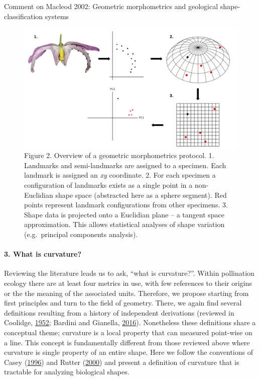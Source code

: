 \documentclass[]{article}
\let\oldparagraph\paragraph
\renewcommand{\paragraph}[1]{\oldparagraph{#1}\mbox{}}
\begin{document}
Comment on Macleod 2002: Geometric morphometrics and geological
shape-classification systems

\begin{figure}
\centering
\includegraphics{Figures/Figure_2.jpg}
\caption{Figure 2. Overview of a geometric morphometrics protocol. 1.
Landmarks and semi-landmarks are assigned to a specimen. Each landmark
is assigned an \emph{xy} coordinate. 2. For each specimen a
configuration of landmarks exists as a single point in a non-Euclidian
shape space (abstracted here as a sphere segment). Red points represent
landmark configurations from other specimens. 3. Shape data is projected
onto a Euclidian plane -- a tangent space approximation. This allows
statistical analyses of shape variation (e.g.~principal components
analysis).}
\end{figure}

\hypertarget{what-is-curvature}{%
\paragraph{3. What is curvature?}\label{what-is-curvature}}

Reviewing the literature leads us to ask, ``what is curvature?''. Within
pollination ecology there are at least four metrics in use, with few
references to their origins or the the meaning of the associated units.
Therefore, we propose starting from first principles and turn to the
field of geometry. There, we again find several definitions resulting
from a history of independent derivations (reviewed in Coolidge,
\protect\hyperlink{ref-coolidge_1952}{1952}; Bardini and Gianella,
\protect\hyperlink{ref-bardini_2016}{2016}). Nonetheless these
definitions share a conceptual theme; curvature is a local property that
can measured point-wise on a line. This concept is fundamentally
different from those reviewed above where curvature is single property
of an entire shape. Here we follow the conventions of Casey
(\protect\hyperlink{ref-casey_1996}{1996}) and Rutter
(\protect\hyperlink{ref-rutter_2000}{2000}) and present a definition of
curvature that is tractable for analyzing biological shapes.
\end{document}
